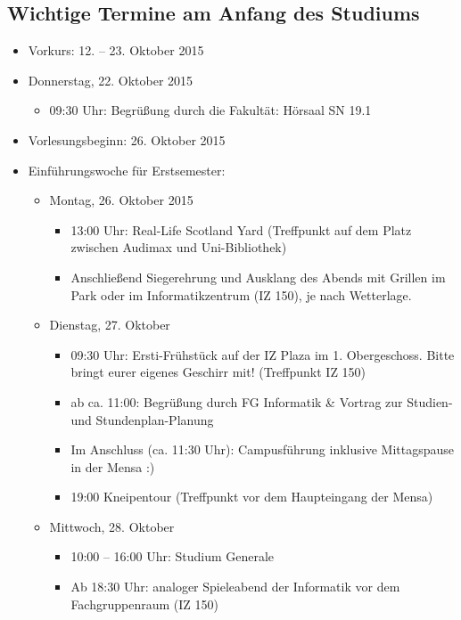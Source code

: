 \subsection{Wichtige Termine am Anfang des Studiums}


\renewcommand{\labelitemi}{$\bullet$}
\renewcommand{\labelitemii}{$\bullet$}
\renewcommand{\labelitemiii}{$\bullet$}
\renewcommand{\labelitemiv}{$\bullet$}

\begin{itemize}
\item Vorkurs: 12. – 23. Oktober 2015
\item Donnerstag, 22. Oktober 2015
\begin{itemize}
\item 09:30 Uhr: Begrüßung durch die Fakultät: Hörsaal SN 19.1
\end{itemize}
\item Vorlesungsbeginn: 26. Oktober 2015
\item Einführungswoche für Erstsemester:
\begin{itemize}
\item Montag, 26. Oktober 2015
\begin{itemize}
\item 13:00 Uhr: Real-Life Scotland Yard (Treffpunkt auf dem Platz zwischen Audimax und Uni-Bibliothek)
\item Anschließend Siegerehrung und Ausklang des Abends mit Grillen im Park oder im Informatikzentrum (IZ 150), je nach Wetterlage.
\end{itemize}
\item Dienstag, 27. Oktober
\begin{itemize}
\item 09:30 Uhr: Ersti-Frühstück auf der IZ Plaza im 1. Obergeschoss. Bitte bringt eurer eigenes Geschirr mit! (Treffpunkt IZ 150)
\item ab ca. 11:00: Begrüßung durch FG Informatik \& Vortrag zur Studien- und Stundenplan-Planung
\item Im Anschluss (ca. 11:30 Uhr): Campusführung inklusive Mittagspause in der Mensa :)
\item 19:00 Kneipentour (Treffpunkt vor dem Haupteingang der Mensa)
\end{itemize}
\item Mittwoch, 28. Oktober
\begin{itemize}
\item 10:00 – 16:00 Uhr: Studium Generale
\item Ab 18:30 Uhr: analoger Spieleabend der Informatik vor dem Fachgruppenraum (IZ 150)

\end{itemize}
\end{itemize}
\end{itemize}
